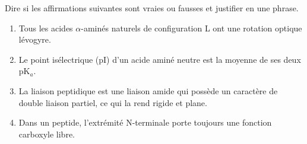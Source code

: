 \documentclass[11pt]{article}
\begin{document}
\begin{exercice}
Dire si les affirmations suivantes sont vraies ou fausses et justifier en une phrase.
\begin{enumerate}
    \item Tous les acides $\alpha$-aminés naturels de configuration L ont une rotation optique lévogyre.
    \item Le point isélectrique (pI) d'un acide aminé neutre est la moyenne de ses deux pK$_a$.
    \item La liaison peptidique est une liaison amide qui possède un caractère de double liaison partiel, ce qui la rend rigide et plane.
    \item Dans un peptide, l'extrémité N-terminale porte toujours une fonction carboxyle libre.
\end{enumerate}
\end{exercice}
\end{document}
